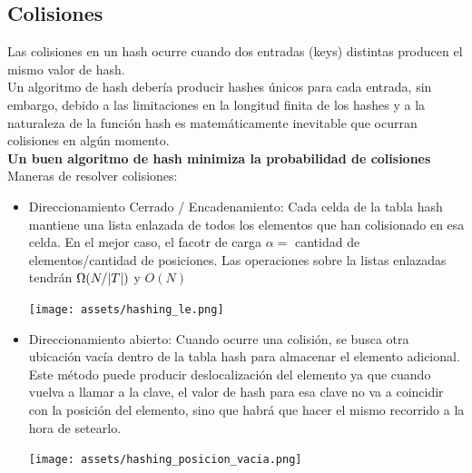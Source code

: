 \documentclass[10pt,a4paper]{article}
\begin{document}
\subsection*{Colisiones}
Las colisiones en un hash ocurre cuando dos entradas (keys) distintas producen el mismo valor de hash. \\
Un algoritmo de hash debería producir hashes únicos para cada entrada, sin embargo, debido a las limitaciones en la longitud finita de los hashes y a la naturaleza de la función hash es matemáticamente inevitable que ocurran colisiones en algún momento. \\
\textbf{Un buen algoritmo de hash minimiza la probabilidad de colisiones} \\
Maneras de resolver colisiones:
\begin{itemize}
    \item Direccionamiento Cerrado / Encadenamiento: Cada celda de la tabla hash mantiene una lista enlazada de todos los elementos que han colisionado en esa celda. En el mejor caso, el facotr de carga $\alpha =$ cantidad de elementos/cantidad de posiciones. Las operaciones sobre la listas enlazadas tendrán $\Omega(N/|T|)$ y $O(N)$ 
    \begin{center}
        \begin{minipage}[b]{0.5\textwidth}
            \texttt{[image: assets/hashing\_le.png]}
            \centering
            \label{fig:hashing_le}
        \end{minipage}
    \end{center}
    \item Direccionamiento abierto: Cuando ocurre una colisión, se busca otra ubicación vacía dentro de la tabla hash para almacenar el elemento adicional. Este método puede producir deslocalización del elemento ya que cuando vuelva a llamar a la clave, el valor de hash para esa clave no va a coincidir con la posición del elemento, sino que habrá que hacer el mismo recorrido a la hora de setearlo. 
    \begin{center}
        \begin{minipage}[b]{0.5\textwidth}
            \texttt{[image: assets/hashing\_posicion\_vacia.png]}
            \centering
            \label{fig:hashing_posicion_vacia}
        \end{minipage}
    \end{center}
\end{itemize}
\end{document}
